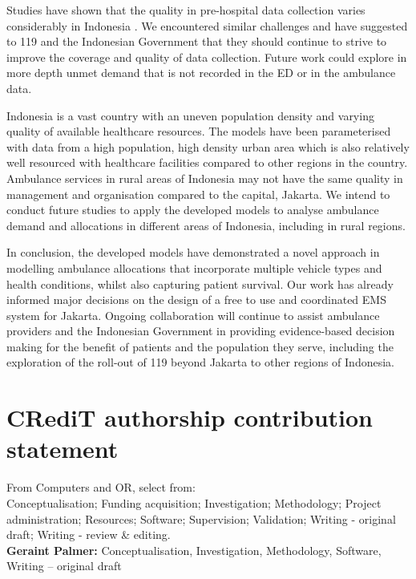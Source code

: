 \documentclass[preprint,12pt]{elsarticle}
\begin{document}
Studies have shown that the quality in pre-hospital data collection varies
considerably in Indonesia \cite{hooper2019_datacollection}. We encountered
similar challenges and have suggested to 119 and the Indonesian Government that
they should continue to strive to improve the coverage and quality of data
collection. Future work could explore in more depth unmet demand that is not
recorded in the ED or in the ambulance data.

Indonesia is a vast country with an uneven population density and varying
quality of available healthcare resources. The models have been parameterised
with data from a high population, high density urban area which is also
relatively well resourced with healthcare facilities compared to other regions
in the country. Ambulance services in rural areas of Indonesia may not have the
same quality in management and organisation compared to the capital, Jakarta. We
intend to conduct future studies to apply the developed models to analyse
ambulance demand and allocations in different areas of Indonesia, including in
rural regions.

In conclusion, the developed models have demonstrated a novel approach in
modelling ambulance allocations that incorporate multiple vehicle types and
health conditions, whilst also capturing patient survival. Our work has already
informed major decisions on the design of a free to use and coordinated EMS
system for Jakarta. Ongoing collaboration will continue to assist ambulance
providers and the Indonesian Government in providing evidence-based decision
making for the benefit of patients and the population they serve, including the
exploration of the roll-out of 119 beyond Jakarta to other regions of Indonesia. 

\section*{CRediT authorship contribution statement}

From Computers and OR, select from:\\

Conceptualisation; Funding acquisition; Investigation; Methodology; Project
administration; Resources; Software; Supervision; Validation; Writing - original
draft; Writing - review \& editing.\\


{\bf Geraint Palmer:} Conceptualisation, Investigation, Methodology, Software,
Writing – original draft\\
\end{document}
